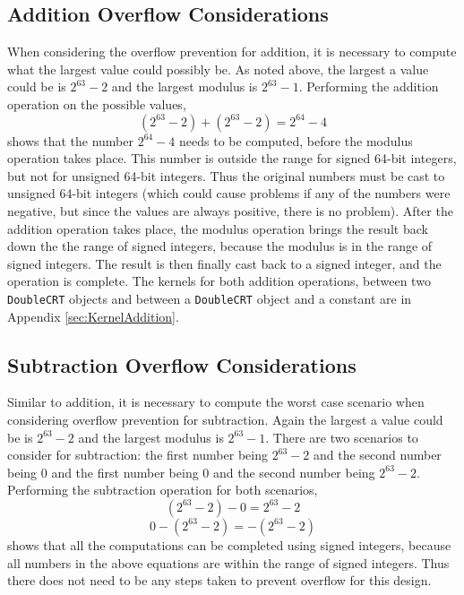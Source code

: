 \subsection{Addition Overflow Considerations}
When considering the overflow prevention for addition, it is necessary to compute what the largest value could possibly be. As noted above, the largest a value could be is $2^{63} - 2$ and the largest modulus is $2^{63} - 1$. Performing the addition operation on the possible values, 
\begin{equation} \label{eq:add}
(2^{63} - 2) + (2^{63} - 2) = 2^{64} - 4
\end{equation}
shows that the number $2^{64} - 4$ needs to be computed, before the modulus operation takes place. This number is outside the range for signed 64-bit integers, but not for unsigned 64-bit integers. Thus the original numbers must be cast to unsigned 64-bit integers (which could cause problems if any of the numbers were negative, but since the values are always positive, there is no problem). After the addition operation takes place, the modulus operation brings the result back down the the range of signed integers, because the modulus is in the range of signed integers. The result is then finally cast back to a signed integer, and the operation is complete. The kernels for both addition operations, between two \verb|DoubleCRT| objects and between a \verb|DoubleCRT| object and a constant are in Appendix 
\ref{sec:KernelAddition}.

\subsection{Subtraction Overflow Considerations}
Similar to addition, it is necessary to compute the worst case scenario when considering overflow prevention for subtraction. Again the largest a value could be is $2^{63} - 2$ and the largest modulus is $2^{63} - 1$. There are two scenarios to consider for subtraction: the first number being $2^{63} - 2$ and the second number being 0 and the first number being 0 and the second number being $2^{63} - 2$. Performing the subtraction operation for both scenarios,
\begin{equation} \label{eq:sub1}
(2^{63} - 2) - 0 = 2^{63} - 2
\end{equation}
\begin{equation} \label{eq:sub2}
0 - (2^{63} - 2) = -(2^{63} - 2)
\end{equation}
shows that all the computations can be completed using signed integers, because all numbers in the above equations are within the range of signed integers. Thus there does not need to be any steps taken to prevent overflow for this design. 


